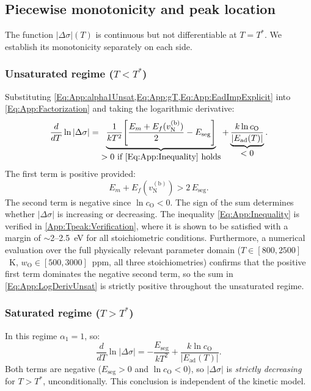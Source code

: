 \documentclass[preprint,12pt,sort&compress]{elsarticle}
\newcommand{\?}{\stackrel{?}{=}}
\begin{document}
\subsection{Piecewise monotonicity and peak location}
\label{App:Tpeak:Monotonicity}

The function $|\Delta \sigma|(T)$ is continuous but not differentiable at $T = T^*$. We establish its monotonicity separately on each side.

\subsubsection{Unsaturated regime (\texorpdfstring{$T < T^*$}{T < T*})}

Substituting \cref{Eq:App:alpha1Unsat,Eq:App:gT,Eq:App:EadImpExplicit} into \cref{Eq:App:Factorization} and taking the logarithmic derivative:
\begin{equation}
\frac{d}{dT}\ln|\Delta \sigma| = \underbrace{\frac{1}{kT^2}\!\left[\frac{E_m + E_f(v_\text{N}^{(\text{b})})}{2} - E_\text{seg}\right]}_{\displaystyle > 0 \text{ if \cref{Eq:App:Inequality} holds}} + \underbrace{\frac{k\ln c_\text{O}}{|E_\text{ad}(T)|}}_{\displaystyle < 0}.
\label{Eq:App:LogDerivUnsat}
\end{equation}
The first term is positive provided:
\begin{equation}
E_m + E_f(v_\text{N}^{(\text{b})}) > 2\,E_\text{seg}.
\label{Eq:App:Inequality}
\end{equation}
The second term is negative since $\ln c_\text{O} < 0$. The sign of the sum determines whether $|\Delta \sigma|$ is increasing or decreasing. The inequality \cref{Eq:App:Inequality} is verified in \ref{App:Tpeak:Verification}, where it is shown to be satisfied with a margin of $\sim$2--2.5~eV for all stoichiometric conditions. Furthermore, a numerical evaluation over the full physically relevant parameter domain ($T \in [800, 2500]$~K, $w_\text{O} \in [500, 3000]$~ppm, all three stoichiometries) confirms that the positive first term dominates the negative second term, so the sum in \cref{Eq:App:LogDerivUnsat} is strictly positive throughout the unsaturated regime.

\subsubsection{Saturated regime (\texorpdfstring{$T > T^*$}{T > T*})}

In this regime $\alpha_1 = 1$, so:
\begin{equation}
\frac{d}{dT}\ln|\Delta \sigma| = -\frac{E_\text{seg}}{kT^2} + \frac{k\ln c_\text{O}}{|E_\text{ad}(T)|}.
\label{Eq:App:LogDerivSat}
\end{equation}
Both terms are negative ($E_\text{seg} > 0$ and $\ln c_\text{O} < 0$), so $|\Delta \sigma|$ is \emph{strictly decreasing} for $T > T^*$, unconditionally. This conclusion is independent of the kinetic model.
\end{document}
